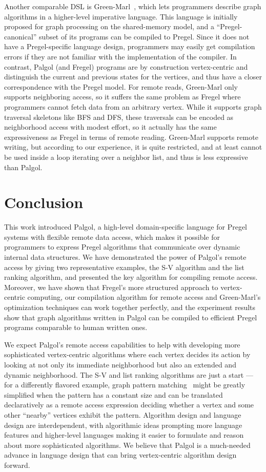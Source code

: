 \documentclass{sokendai_thesis} %
\begin{document}
Another comparable DSL is Green-Marl~\cite{green12}, which lets programmers describe graph algorithms in a higher-level imperative language.
This language is initially proposed for graph processing on the shared-memory model, and a ``Pregel-canonical'' subset of its programs can be compiled to Pregel.
Since it does not have a Pregel-specific language design, programmers may easily get compilation errors if they are not familiar with the implementation of the compiler.
In contrast, Palgol (and Fregel) programs are by construction vertex-centric and distinguish the current and previous states for the vertices, and thus have a closer correspondence with the Pregel model.
For remote reads, Green-Marl only supports neighboring access, so it suffers the same problem as Fregel where programmers cannot fetch data from an arbitrary vertex.
While it supports graph traversal skeletons like BFS and DFS, these traversals can be encoded as neighborhood access with modest effort, so it actually has the same expressiveness as Fregel in terms of remote reading.
Green-Marl supports remote writing, but according to our experience, it is quite restricted, and at least cannot be used inside a loop iterating over a neighbor list, and thus is less expressive than Palgol.

\chapter{Conclusion}
\label{sec:conclusions}

This work introduced Palgol, a high-level domain-specific language for Pregel systems with flexible remote data access, which makes it possible for programmers to express Pregel algorithms that communicate over dynamic internal data structures.
We have demonstrated the power of Palgol's remote access by giving two representative examples, the S-V algorithm and the list ranking algorithm, and presented the key algorithm for compiling remote access.
Moreover, we have shown that Fregel's more structured approach to vertex-centric computing, our compilation algorithm for remote access and Green-Marl's optimization techniques can work together perfectly, and the experiment results show that graph algorithms written in Palgol can be compiled to efficient Pregel programs comparable to human written ones.

We expect Palgol's remote access capabilities to help with developing more sophisticated vertex-centric algorithms where each vertex decides its action by looking at not only its immediate neighborhood but also an extended and dynamic neighborhood.
The S-V and list ranking algorithms are just a start --- for a differently flavored example, graph pattern matching~\cite{graphpm} might be greatly simplified when the pattern has a constant size and can be translated declaratively as a remote access expression deciding whether a vertex and some other ``nearby'' vertices exhibit the pattern.
Algorithm design and language design are interdependent, with algorithmic ideas prompting more language features and higher-level languages making it easier to formulate and reason about more sophisticated algorithms.
We believe that Palgol is a much-needed advance in language design that can bring vertex-centric algorithm design forward.
\end{document}
